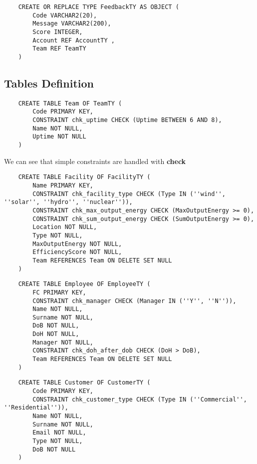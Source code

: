\begin{lstlisting}
    CREATE OR REPLACE TYPE FeedbackTY AS OBJECT (
        Code VARCHAR2(20),
        Message VARCHAR2(200),
        Score INTEGER,
        Account REF AccountTY ,
        Team REF TeamTY
    )
\end{lstlisting}

\subsection{Tables Definition}

\begin{lstlisting}
    CREATE TABLE Team OF TeamTY (
        Code PRIMARY KEY,
        CONSTRAINT chk_uptime CHECK (Uptime BETWEEN 6 AND 8),
        Name NOT NULL,
        Uptime NOT NULL
    )
\end{lstlisting}

We can see that simple constraints are handled with \textbf{check}

\begin{lstlisting}
    CREATE TABLE Facility OF FacilityTY (
        Name PRIMARY KEY,
        CONSTRAINT chk_facility_type CHECK (Type IN (''wind'', ''solar'', ''hydro'', ''nuclear'')),
        CONSTRAINT chk_max_output_energy CHECK (MaxOutputEnergy >= 0),
        CONSTRAINT chk_sum_output_energy CHECK (SumOutputEnergy >= 0),
        Location NOT NULL,
        Type NOT NULL,
        MaxOutputEnergy NOT NULL,
        EfficiencyScore NOT NULL,
        Team REFERENCES Team ON DELETE SET NULL
    )
\end{lstlisting}


\begin{lstlisting}
    CREATE TABLE Employee OF EmployeeTY (
        FC PRIMARY KEY,
        CONSTRAINT chk_manager CHECK (Manager IN (''Y'', ''N'')),
        Name NOT NULL,
        Surname NOT NULL,
        DoB NOT NULL,
        DoH NOT NULL,
        Manager NOT NULL,
        CONSTRAINT chk_doh_after_dob CHECK (DoH > DoB),
        Team REFERENCES Team ON DELETE SET NULL
    )
\end{lstlisting}


\begin{lstlisting}
    CREATE TABLE Customer OF CustomerTY (
        Code PRIMARY KEY,
        CONSTRAINT chk_customer_type CHECK (Type IN (''Commercial'', ''Residential'')),
        Name NOT NULL,
        Surname NOT NULL,
        Email NOT NULL,
        Type NOT NULL,
        DoB NOT NULL
    )
\end{lstlisting}



